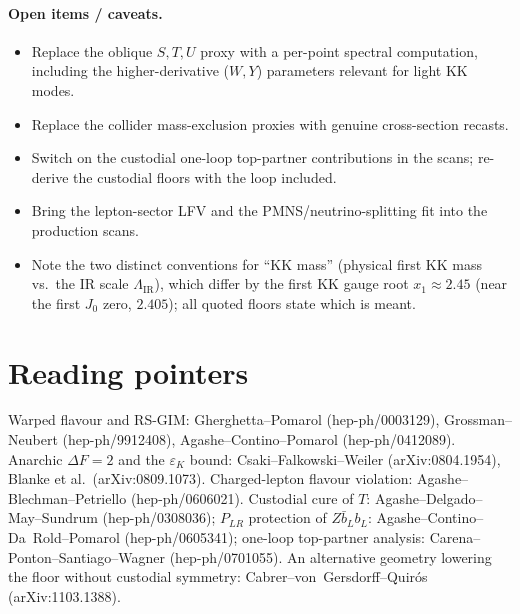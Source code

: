 \documentclass[11pt]{article}
\newcommand{\LIR}{\Lambda_{\mathrm{IR}}}
\newcommand{\epsK}{\varepsilon_K}
\begin{document}
\paragraph{Open items / caveats.}
\begin{itemize}[leftmargin=1.4em]
\item Replace the oblique $S,T,U$ proxy with a per-point spectral computation,
including the higher-derivative ($W,Y$) parameters relevant for light KK modes.
\item Replace the collider mass-exclusion proxies with genuine cross-section
recasts.
\item Switch on the custodial one-loop top-partner contributions in the scans;
re-derive the custodial floors with the loop included.
\item Bring the lepton-sector LFV and the PMNS/neutrino-splitting fit into the
production scans.
\item Note the two distinct conventions for ``KK mass'' (physical first KK mass
vs.\ the IR scale $\LIR$), which differ by the first KK gauge root
$x_1\approx 2.45$ (near the first $J_0$ zero, $2.405$); all quoted floors
state which is meant.
\end{itemize}

\section*{Reading pointers}

Warped flavour and RS-GIM: Gherghetta--Pomarol (hep-ph/0003129),
Grossman--Neubert (hep-ph/9912408), Agashe--Contino--Pomarol (hep-ph/0412089).
Anarchic $\Delta F=2$ and the $\epsK$ bound: Csaki--Falkowski--Weiler
(arXiv:0804.1954), Blanke et al.\ (arXiv:0809.1073). Charged-lepton flavour
violation: Agashe--Blechman--Petriello (hep-ph/0606021). Custodial cure of $T$:
Agashe--Delgado--May--Sundrum (hep-ph/0308036); $P_{LR}$ protection of
$Z\bar b_L b_L$: Agashe--Contino--Da~Rold--Pomarol (hep-ph/0605341); one-loop
top-partner analysis: Carena--Ponton--Santiago--Wagner (hep-ph/0701055). An
alternative geometry lowering the floor without custodial symmetry:
Cabrer--von~Gersdorff--Quir\'os (arXiv:1103.1388).
\end{document}
